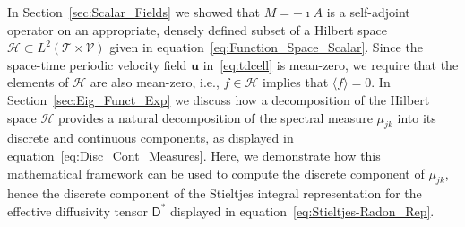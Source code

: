 \documentclass[leqno,onefignum,onetabnum]{siamltex1213}
\newcommand{\secref}[1]{Section~\ref{#1}}
\newcommand{\Tc}{\mathcal{T}}
\newcommand{\Vc}{\mathcal{V}}
\newcommand{\Dm}{\mathsf{D}}
\newcommand{\Hs}{\mathscr{H}}
\newcommand{\vecu}{\boldsymbol{u}}
\begin{document}
In \secref{sec:Scalar_Fields} we showed that $M=-\imath A$ is a
self-adjoint operator on an appropriate, densely defined subset of a
Hilbert space $\Hs\subset L^2(\Tc\times\Vc)$ given in
equation~\eqref{eq:Function_Space_Scalar}. Since the space-time
periodic velocity field $\vecu$ 
in~\eqref{eq:tdcell} is mean-zero, we require that the elements of
$\Hs$ are also mean-zero, i.e., $f\in\Hs$ implies that $\langle f\rangle=0$. In
\secref{sec:Eig_Funct_Exp} we discuss how a decomposition of the
Hilbert space $\Hs$ provides a natural decomposition of the spectral
measure $\mu_{jk}$ into its discrete and continuous components, as
displayed in equation~\eqref{eq:Disc_Cont_Measures}. Here, we
demonstrate how this mathematical framework can be used to compute the
discrete component of $\mu_{jk}$, hence the discrete component of the
Stieltjes integral representation for the effective diffusivity tensor
$\Dm^*$ displayed in equation~\eqref{eq:Stieltjes-Radon_Rep}.
\end{document}
